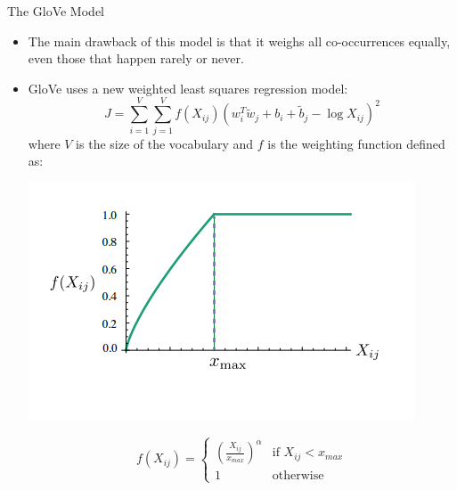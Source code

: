\documentclass{beamer}
\begin{document}
\begin{frame}{The GloVe Model}
	\begin{itemize}
		\item The main drawback of this model is that it weighs all co-occurrences equally, even those that happen rarely or never.
		\item GloVe uses a new weighted least squares regression model:
		$$J = \sum_{i=1}^{V}\sum_{j=1}^{V}f(X_{ij})\left(w_i^T \widetilde{w}_j + b_i + \widetilde{b}_j - \log X_{ij}\right)^2$$
		where $V$ is the size of the vocabulary and $f$ is the weighting function defined as:
		
		\begin{minipage}{0.45\textwidth}
			\includegraphics[scale=0.4]{images/glove-fig-1}
		\end{minipage}
		\begin{minipage}{0.3\textwidth}
			\begin{equation*}
			f(X_{ij}) =
			\begin{cases}
			\left(\frac{X_{ij}}{x_{max}}\right)^\alpha & \text{if } X_{ij} < x_{max}\\
			1 & \text{otherwise}
			\end{cases}
			\end{equation*}
		\end{minipage}
	\end{itemize}
 \end{frame}
\end{document}
